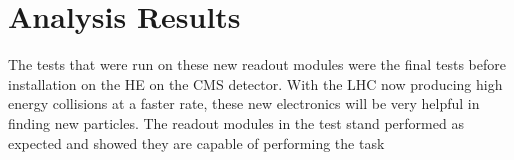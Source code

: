 \section{Analysis Results}

The tests that were run on these new readout modules were the final tests before installation on the HE on the CMS detector. With the LHC now producing high energy collisions at a faster rate, these new electronics will be very helpful in finding new particles. The readout modules in the test stand performed as expected and showed they are capable of performing the task